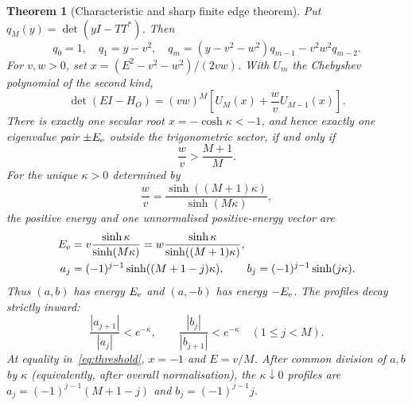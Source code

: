 \documentclass[10pt]{article}
\newtheorem{theorem}{Theorem}
\begin{document}
\begin{theorem}[Characteristic and sharp finite edge theorem]\label{thm:edge}
Put $q_M(y)=\det(yI-TT^*)$.  Then
\begin{equation}\label{eq:recurrence}
 q_0=1,\quad q_1=y-v^2,\quad
 q_m=(y-v^2-w^2)q_{m-1}-v^2w^2q_{m-2}.
\end{equation}
For $v,w>0$, set $x=(E^2-v^2-w^2)/(2vw)$.  With $U_m$ the Chebyshev
polynomial of the second kind,
\begin{equation}\label{eq:characteristic}
 \det(EI-H_O)=(vw)^M
 \left[U_M(x)+\frac{w}{v}U_{M-1}(x)\right].
\end{equation}
There is exactly one secular root $x=-\cosh\kappa<-1$, and hence exactly
one eigenvalue pair $\pm E_{\rm e}$ outside the trigonometric sector, if and
only if
\begin{equation}\label{eq:threshold}
 \frac{w}{v}>\frac{M+1}{M}.
\end{equation}
For the unique $\kappa>0$ determined by
\begin{equation}\label{eq:kappa}
 \frac{w}{v}=\frac{\sinh((M+1)\kappa)}{\sinh(M\kappa)},
\end{equation}
the positive energy and one unnormalised positive-energy vector are
\begin{align}
 E_{\rm e}
 &=v\frac{\sinh\kappa}{\sinh(M\kappa)}
 =w\frac{\sinh\kappa}{\sinh((M+1)\kappa)},\label{eq:energy}\\
 a_j&=(-1)^{j-1}\sinh((M+1-j)\kappa),\qquad
 b_j=(-1)^{j-1}\sinh(j\kappa).\label{eq:vectors}
\end{align}
Thus $(a,b)$ has energy $E_{\rm e}$ and $(a,-b)$ has energy $-E_{\rm e}$.
The profiles decay strictly inward:
\begin{equation}\label{eq:decay}
 \frac{|a_{j+1}|}{|a_j|}<e^{-\kappa},\qquad
 \frac{|b_j|}{|b_{j+1}|}<e^{-\kappa}\quad(1\leq j<M).
\end{equation}
At equality in~\eqref{eq:threshold}, $x=-1$ and $E=v/M$.  After common
division of $a,b$ by $\kappa$ (equivalently, after overall normalisation),
the $\kappa\downarrow0$ profiles are
$a_j=(-1)^{j-1}(M+1-j)$ and $b_j=(-1)^{j-1}j$.
\end{theorem}
\end{document}
